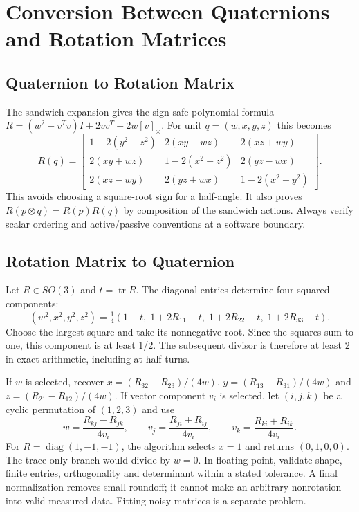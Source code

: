 \section{Conversion Between Quaternions and Rotation Matrices}
\label{sec:quat_to_matrix}

\subsection{Quaternion to Rotation Matrix}
\label{thm:quat_to_matrix}

The sandwich expansion gives the sign-safe polynomial formula $R=(w^2-v^Tv)I+2vv^T+2w[v]_\times$. For unit $q=(w,x,y,z)$ this becomes
\begin{equation}
 R(q)=\begin{bmatrix}
 1-2(y^2+z^2)&2(xy-wz)&2(xz+wy)\\
 2(xy+wz)&1-2(x^2+z^2)&2(yz-wx)\\
 2(xz-wy)&2(yz+wx)&1-2(x^2+y^2)
 \end{bmatrix}.
 \label{eq:quat_to_matrix}
\end{equation}
This avoids choosing a square-root sign for a half-angle. It also proves $R(p\otimes q)=R(p)R(q)$ by composition of the sandwich actions. Always verify scalar ordering and active/passive conventions at a software boundary.

\subsection{Rotation Matrix to Quaternion}
\label{thm:matrix_to_quat}

Let $R\in SO(3)$ and $t=\operatorname{tr}R$. The diagonal entries determine four squared components:
\begin{equation}
 (w^2,x^2,y^2,z^2)=\tfrac 14(1+t,\;1+2R_{11}-t,\;1+2R_{22}-t,\;1+2R_{33}-t).
 \label{eq:quaternion_component_squares}
\end{equation}
Choose the largest square and take its nonnegative root. Since the squares sum to one, this component is at least 1/2. The subsequent divisor is therefore at least 2 in exact arithmetic, including at half turns.

If $w$ is selected, recover $x=(R_{32}-R_{23})/(4w)$, $y=(R_{13}-R_{31})/(4w)$ and $z=(R_{21}-R_{12})/(4w)$. If vector component $v_i$ is selected, let $(i,j,k)$ be a cyclic permutation of $(1,2,3)$ and use
\begin{equation}
 w=\frac{R_{kj}-R_{jk}}{4v_i},\qquad
 v_j=\frac{R_{ji}+R_{ij}}{4v_i},\qquad
 v_k=\frac{R_{ki}+R_{ik}}{4v_i}.
 \label{eq:quaternion_largest_component}
\end{equation}
For $R=\operatorname{diag}(1,-1,-1)$, the algorithm selects $x=1$ and returns $(0,1,0,0)$. The trace-only branch would divide by $w=0$. In floating point, validate shape, finite entries, orthogonality and determinant within a stated tolerance. A final normalization removes small roundoff; it cannot make an arbitrary nonrotation into valid measured data. Fitting noisy matrices is a separate problem.

